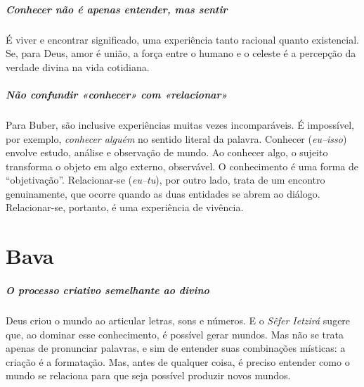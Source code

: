 \paragraph{Conhecer não é apenas entender, mas sentir} É viver e encontrar significado, uma experiência tanto racional quanto existencial. Se, para Deus, amor é união, a força entre o humano e o celeste é a percepção da verdade divina na vida cotidiana.

\paragraph{Não confundir «conhecer» com «relacionar»} Para Buber, são inclusive experiências muitas vezes incomparáveis. É impossível, por exemplo, \textit{conhecer alguém} no sentido literal da palavra. Conhecer (\textit{eu--isso}) envolve estudo, análise e observação de mundo. Ao conhecer algo, o sujeito transforma o objeto em algo externo, observável. O conhecimento é uma forma de ``objetivação''. Relacionar-se (\textit{eu--tu}), por outro lado, trata de um encontro genuinamente, que ocorre quando as duas entidades se abrem ao diálogo. Relacionar-se, portanto, é uma experiência de vivência.

\chapter*{Bava \smallskip{}}

\setlength{\epigraphwidth}{.60\textwidth}
\begin{epigraphs} 
\end{epigraphs}

\begin{center}
{\huge{}}
\end{center}

\paragraph{O processo criativo semelhante ao divino} Deus criou o mundo ao articular letras, sons e números. E o \textit{Sêfer Ietzirá} sugere que, ao dominar esse conhecimento, é possível gerar mundos. Mas não se trata apenas de pronunciar palavras, e sim de entender suas combinações místicas: a criação é a formatação. Mas, antes de qualquer coisa, é preciso entender como o mundo se relaciona para que seja possível produzir novos mundos. 

